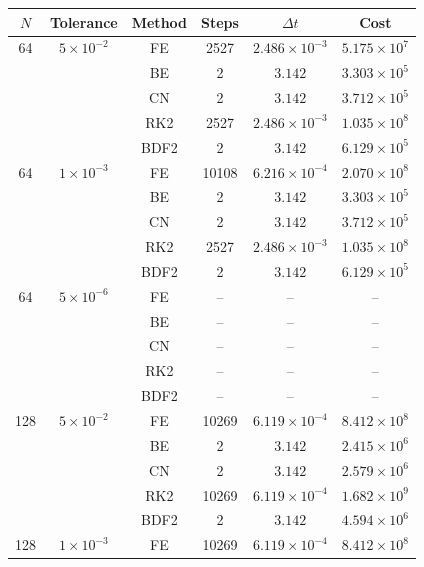 \documentclass[11pt]{article}
\begin{document}
\begin{table}[H]
\centering
\small
\begin{tabular}{cccccc}
\toprule
$N$ & Tolerance & Method & Steps & $\Delta t$ & Cost \\
\midrule
64 & $5\times10^{-2}$ & FE   & 2527  & $2.486\times10^{-3}$ & $5.175\times10^7$ \\
   &                   & BE   & 2     & $3.142$              & $3.303\times10^5$ \\
   &                   & CN   & 2     & $3.142$              & $3.712\times10^5$ \\
   &                   & RK2  & 2527  & $2.486\times10^{-3}$ & $1.035\times10^8$ \\
   &                   & BDF2 & 2     & $3.142$              & $6.129\times10^5$ \\
\midrule
64 & $1\times10^{-3}$ & FE   & 10108 & $6.216\times10^{-4}$ & $2.070\times10^8$ \\
   &           & BE   & 2     & $3.142$              & $3.303\times10^5$ \\
   &           & CN   & 2     & $3.142$              & $3.712\times10^5$ \\
   &           & RK2  & 2527  & $2.486\times10^{-3}$ & $1.035\times10^8$ \\
   &           & BDF2 & 2     & $3.142$              & $6.129\times10^5$ \\
\midrule
64 & $5\times10^{-6}$ & FE   & -- & -- & -- \\
   &                   & BE   & -- & -- & -- \\
   &                   & CN   & -- & -- & -- \\
   &                   & RK2  & -- & -- & -- \\
   &                   & BDF2 & -- & -- & -- \\
\midrule
128 & $5\times10^{-2}$ & FE   & 10269 & $6.119\times10^{-4}$ & $8.412\times10^8$ \\
    &                   & BE   & 2     & $3.142$              & $2.415\times10^6$ \\
    &                   & CN   & 2     & $3.142$              & $2.579\times10^6$ \\
    &                   & RK2  & 10269 & $6.119\times10^{-4}$ & $1.682\times10^9$ \\
    &                   & BDF2 & 2     & $3.142$              & $4.594\times10^6$ \\
\midrule
128 & $1\times10^{-3}$ & FE   & 10269 & $6.119\times10^{-4}$ & $8.412\times10^8$ \\

\end{tabular}
\end{table}
\end{document}
